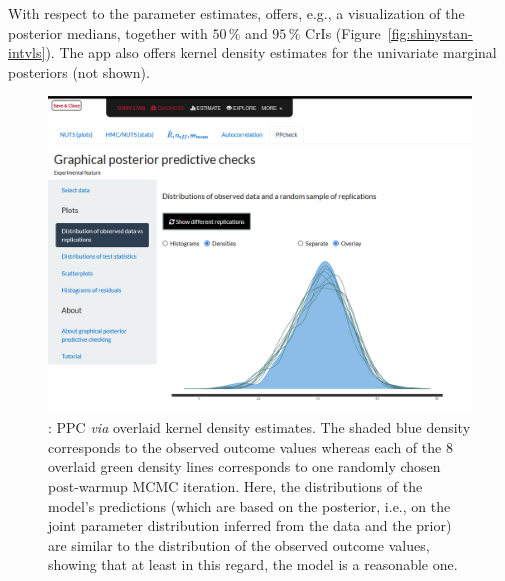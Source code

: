 With respect to the parameter estimates,  offers, e.g., a
visualization of the posterior medians, together with $50\,\%$ and $95\,\%$
CrIs (Figure~\ref{fig:shinystan-intvls}). The 
app also offers kernel density estimates for the univariate marginal
posteriors (not shown).
\begin{figure}[t!]
  \centering
  \includegraphics[width=\textwidth]{Figures/shinystan_PPC_overlay.png}
  \caption[: PPC (densities)]{: PPC \textit{via}
  overlaid kernel density estimates. The shaded blue density corresponds to the
  observed outcome values whereas each of the 8 overlaid green density lines
  corresponds to one randomly chosen post-warmup MCMC iteration.
  Here, the distributions of the model's predictions (which are based on the
  posterior, i.e., on the joint parameter distribution inferred from the data
  and the prior) are similar to the distribution of the observed outcome values,
  showing that at least in this regard, the model is a reasonable one.}
  \label{fig:shinystan-ppc-overlay}
\end{figure}%
